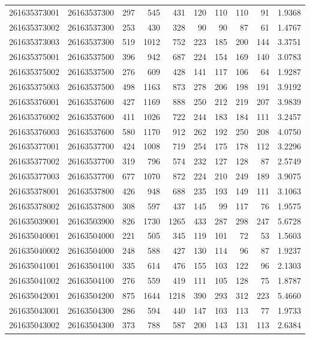 \documentclass[
  11pt,
]{article}
\begin{document}
\begin{longtable}[t]{llrrrrrrrr}
261635373001 & 26163537300 & 297 & 545 & 431 & 120 & 110 & 110 & 91 & 1.9368\\
261635373002 & 26163537300 & 253 & 430 & 328 & 90 & 90 & 87 & 61 & 1.4767\\
261635373003 & 26163537300 & 519 & 1012 & 752 & 223 & 185 & 200 & 144 & 3.3751\\
261635375001 & 26163537500 & 396 & 942 & 687 & 224 & 154 & 169 & 140 & 3.0783\\
261635375002 & 26163537500 & 276 & 609 & 428 & 141 & 117 & 106 & 64 & 1.9287\\
261635375003 & 26163537500 & 498 & 1163 & 873 & 278 & 206 & 198 & 191 & 3.9192\\
261635376001 & 26163537600 & 427 & 1169 & 888 & 250 & 212 & 219 & 207 & 3.9839\\
261635376002 & 26163537600 & 411 & 1026 & 722 & 244 & 183 & 184 & 111 & 3.2457\\
261635376003 & 26163537600 & 580 & 1170 & 912 & 262 & 192 & 250 & 208 & 4.0750\\
261635377001 & 26163537700 & 424 & 1008 & 719 & 254 & 175 & 178 & 112 & 3.2296\\
261635377002 & 26163537700 & 319 & 796 & 574 & 232 & 127 & 128 & 87 & 2.5749\\
261635377003 & 26163537700 & 677 & 1070 & 872 & 224 & 210 & 249 & 189 & 3.9075\\
261635378001 & 26163537800 & 426 & 948 & 688 & 235 & 193 & 149 & 111 & 3.1063\\
261635378002 & 26163537800 & 308 & 597 & 437 & 145 & 99 & 117 & 76 & 1.9575\\
261635039001 & 26163503900 & 826 & 1730 & 1265 & 433 & 287 & 298 & 247 & 5.6728\\
261635040001 & 26163504000 & 221 & 505 & 345 & 119 & 101 & 72 & 53 & 1.5603\\
261635040002 & 26163504000 & 248 & 588 & 427 & 130 & 114 & 96 & 87 & 1.9237\\
261635041001 & 26163504100 & 335 & 614 & 476 & 155 & 103 & 122 & 96 & 2.1303\\
261635041002 & 26163504100 & 276 & 559 & 419 & 111 & 105 & 128 & 75 & 1.8787\\
261635042001 & 26163504200 & 875 & 1644 & 1218 & 390 & 293 & 312 & 223 & 5.4660\\
261635043001 & 26163504300 & 286 & 594 & 440 & 147 & 103 & 113 & 77 & 1.9733\\
261635043002 & 26163504300 & 373 & 788 & 587 & 200 & 143 & 131 & 113 & 2.6384\\

\end{longtable}
\end{document}
